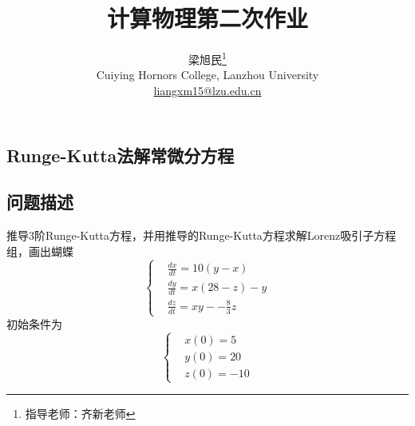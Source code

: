 \documentclass[twoside,twocolumn]{article}
\begin{document}
\begin{CJK*}{UTF8}{gkai}

\setlength{\droptitle}{-4\baselineskip} %
\pretitle{\begin{center}\Huge\bfseries} %
	\posttitle{\end{center}} %
\title{计算物理第二次作业} %
\author{
	\textsc{梁旭民}\thanks{\noindent 指导老师：齐新老师} \\[1ex] %
	\normalsize Cuiying Hornors College, Lanzhou University \\ %
	\normalsize \href{mailto:liangxm15@lzu.edu.cn}{liangxm15@lzu.edu.cn} %
}
\date{}
\renewcommand{\maketitlehookd}{
	\begin{abstract}
		本次计算物理作业主要利用lorenz因子混沌方程的粒子学习了Euler法和Rungge-Kutta法求解常微分方程的初值问题，并尝试讨论行星绕恒星运动轨道及三体（两个恒星一个行星）的运行情况。
	\end{abstract}
}
\maketitle


\section{Runge-Kutta法解常微分方程}
\subsection{问题描述}
推导3阶Runge-Kutta方程，并用推导的Runge-Kutta方程求解Lorenz吸引子方程组，画出蝴蝶
\begin{equation*}
	\left\{
	\begin{aligned}
		&\frac{dx}{dt}=10(y-x)\\
		&\frac{dy}{dt}=x(28-z)-y\\
		&\frac{dz}{dt}=xy--\frac{8}{3}z
	\end{aligned}
	\right.
\end{equation*}
初始条件为
\begin{equation*}
	\left\{
	\begin{aligned}
		&x(0)=5\\
		&y(0)=20\\
		&z(0)=-10
	\end{aligned}
	\right.
\end{equation*}

\end{CJK*}
\end{document}
